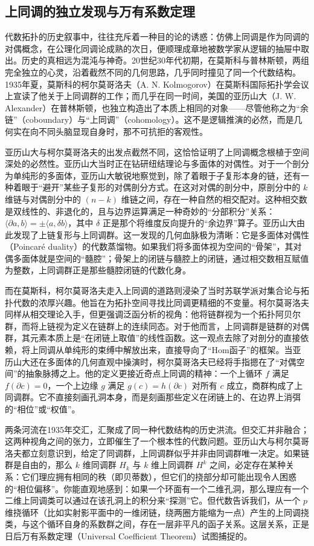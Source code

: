 \documentclass[12pt,a4paper]{article}
\begin{document}
\subsection{上同调的独立发现与万有系数定理}

代数拓扑的历史叙事中，往往充斥着一种目的论的诱惑：仿佛上同调是作为同调的对偶概念，在公理化同调论成熟的次日，便顺理成章地被数学家从逻辑的抽屉中取出。历史的真相远为混沌与神奇。20世纪30年代初期，在莫斯科与普林斯顿，两组完全独立的心灵，沿着截然不同的几何思路，几乎同时撞见了同一个代数结构。1935年夏，莫斯科的柯尔莫哥洛夫（A. N. Kolmogorov）在莫斯科国际拓扑学会议上宣读了他关于上同调群的工作；而几乎在同一时间，美国的亚历山大（J. W. Alexander）在普林斯顿，也独立构造出了本质上相同的对象——尽管他称之为“余链”（coboundary）与“上同调”（cohomology）。这不是逻辑推演的必然，而是几何实在向不同头脑显现自身时，那不可抗拒的客观性。

亚历山大与柯尔莫哥洛夫的出发点截然不同，这恰恰证明了上同调概念根植于空间深处的必然性。亚历山大当时正在钻研纽结理论与多面体的对偶性。对于一个剖分为单纯形的多面体，亚历山大敏锐地察觉到，除了着眼于子复形本身的链，还有一种着眼于“避开”某些子复形的对偶剖分方式。在这对对偶的剖分中，原剖分中的 $k$ 维链与对偶剖分中的 $(n-k)$ 维链之间，存在一种自然的相交配对。这种相交数是双线性的、非退化的，且与边界运算满足一种奇妙的“分部积分”关系：$\langle \partial a, b \rangle = \pm \langle a, \delta b \rangle$，其中 $\delta$ 正是那个将维度反向提升的“余边界”算子。亚历山大由此发现了上链复形与上同调群。这一发现的几何血脉极为清晰：它是多面体对偶性（Poincaré duality）的代数蒸馏物。如果我们将多面体视为空间的“骨架”，其对偶多面体就是空间的“髓腔”；骨架上的闭链与髓腔上的闭链，通过相交数相互赋值为整数，上同调群正是那些髓腔闭链的代数化身。

而在莫斯科，柯尔莫哥洛夫走入上同调的道路则浸染了当时苏联学派对集合论与拓扑代数的浓厚兴趣。他旨在为拓扑空间寻找比同调更精细的不变量。柯尔莫哥洛夫同样从相交理论入手，但更强调泛函分析的视角：他将链群视为一个拓扑阿贝尔群，而将上链视为定义在链群上的连续同态。对于他而言，上同调群是链群的对偶群，其元素本质上是“在闭链上取值”的线性函数。这一观点去除了对剖分的直接依赖，将上同调从单纯形的束缚中解放出来，直接导向了“Hom函子”的框架。当亚历山大还在多面体的几何直观中操演时，柯尔莫哥洛夫已经将手指摁在了“对偶空间”的抽象脉搏之上。他的定义更接近奇点上同调的精神：一个上循环 $f$ 满足 $f(\partial c)=0$，一个上边缘 $g$ 满足 $g(c)=h(\partial c)$ 对所有 $c$ 成立，商群构成了上同调群。它不直接刻画孔洞本身，而是刻画那些定义在闭链上的、在边界上消弭的“相位”或“权值”。

两条河流在1935年交汇，汇聚成了同一种代数结构的历史洪流。但交汇并非融合；这两种视角之间的张力，立即催生了一个根本性的代数问题。亚历山大与柯尔莫哥洛夫都立刻意识到，给定了同调群，上同调群似乎并非由同调群唯一决定。如果链群是自由的，那么 $k$ 维同调群 $H_k$ 与 $k$ 维上同调群 $H^k$ 之间，必定存在某种关系：它们理应拥有相同的秩（即贝蒂数），但它们的挠部分却可能出现令人困惑的“相位偏移”。你能直观地感到：如果一个环面有一个二维孔洞，那么理应有一个二维上同调类可以通过在该孔洞上的积分来“探测”它。但代数告诉我们，从一个 $p$ 维挠循环（比如实射影平面中的一维闭链，绕两圈方能缩为一点）产生的上同调挠类，与这个循环自身的系数群之间，存在一层非平凡的函子关系。这层关系，正是日后万有系数定理（Universal Coefficient Theorem）试图捕捉的。
\end{document}
